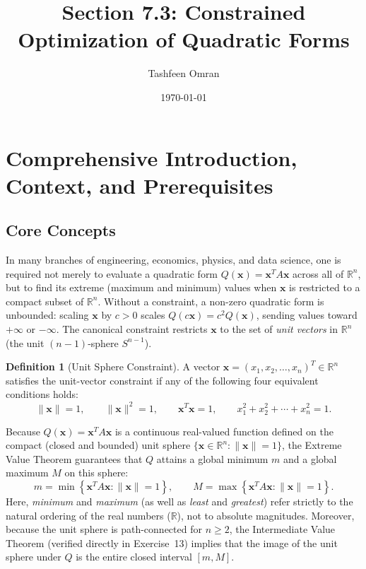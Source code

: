 \documentclass[11pt, letterpaper]{article}
\title{Section 7.3: Constrained Optimization of Quadratic Forms}
\author{Tashfeen Omran}
\date{\today}
\theoremstyle{definition}
\newtheorem{definition}{Definition}[section]
\theoremstyle{remark}
\newcommand{\R}{\mathbb{R}}
\begin{document}
\maketitle
\tableofcontents
\newpage

\section{Comprehensive Introduction, Context, and Prerequisites}

\subsection{Core Concepts}
In many branches of engineering, economics, physics, and data science, one is required not merely to evaluate a quadratic form $Q(\mathbf{x}) = \mathbf{x}^T A \mathbf{x}$ across all of $\R^n$, but to find its extreme (maximum and minimum) values when $\mathbf{x}$ is restricted to a compact subset of $\R^n$. Without a constraint, a non-zero quadratic form is unbounded: scaling $\mathbf{x}$ by $c > 0$ scales $Q(c\mathbf{x}) = c^2 Q(\mathbf{x})$, sending values toward $+\infty$ or $-\infty$. The canonical constraint restricts $\mathbf{x}$ to the set of \emph{unit vectors} in $\R^n$ (the unit $(n-1)$-sphere $S^{n-1}$).

\begin{definition}[Unit Sphere Constraint]
A vector $\mathbf{x} = (x_1, x_2, \dots, x_n)^T \in \R^n$ satisfies the unit-vector constraint if any of the following four equivalent conditions holds:
\[
\|\mathbf{x}\| = 1, \qquad \|\mathbf{x}\|^2 = 1, \qquad \mathbf{x}^T \mathbf{x} = 1, \qquad x_1^2 + x_2^2 + \cdots + x_n^2 = 1.
\]
\end{definition}

Because $Q(\mathbf{x}) = \mathbf{x}^T A \mathbf{x}$ is a continuous real-valued function defined on the compact (closed and bounded) unit sphere $\{\mathbf{x} \in \R^n : \|\mathbf{x}\| = 1\}$, the Extreme Value Theorem guarantees that $Q$ attains a global minimum $m$ and a global maximum $M$ on this sphere:
\[
m = \min\left\{\mathbf{x}^T A \mathbf{x} : \|\mathbf{x}\| = 1\right\}, \qquad M = \max\left\{\mathbf{x}^T A \mathbf{x} : \|\mathbf{x}\| = 1\right\}.
\]
Here, \emph{minimum} and \emph{maximum} (as well as \emph{least} and \emph{greatest}) refer strictly to the natural ordering of the real numbers ($\R$), not to absolute magnitudes. Moreover, because the unit sphere is path-connected for $n \ge 2$, the Intermediate Value Theorem (verified directly in Exercise~13) implies that the image of the unit sphere under $Q$ is the entire closed interval $[m, M]$.
\end{document}
